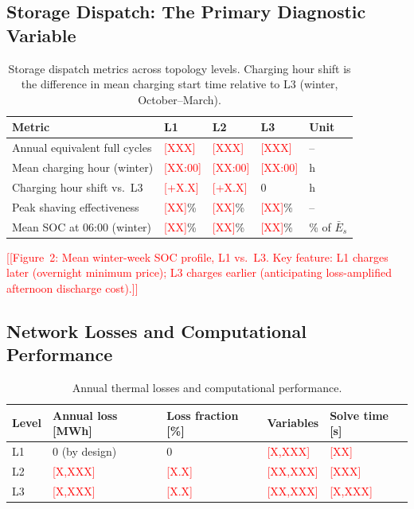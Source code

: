 \documentclass[review,3p]{elsarticle}
\newcommand{\placeholder}[1]{\textcolor{red}{[#1]}}
\begin{document}
\subsection{Storage Dispatch: The Primary Diagnostic Variable}
\label{sec:results_storage}

\begin{table}[htbp]
\centering
\caption{Storage dispatch metrics across topology levels. Charging
hour shift is the difference in mean charging start time relative
to L3 (winter, October--March).}
\label{tab:storage}
\begin{tabular}{@{}lllll@{}}
\toprule
Metric & L1 & L2 & L3 & Unit \\
\midrule
Annual equivalent full cycles   & \placeholder{XXX}   & \placeholder{XXX}   & \placeholder{XXX}   & -- \\
Mean charging hour (winter)     & \placeholder{XX:00} & \placeholder{XX:00} & \placeholder{XX:00} & h \\
Charging hour shift vs.\ L3    & \placeholder{+X.X}  & \placeholder{+X.X}  & 0                   & h \\
Peak shaving effectiveness      & \placeholder{XX}\%  & \placeholder{XX}\%  & \placeholder{XX}\%  & -- \\
Mean SOC at 06:00 (winter)     & \placeholder{XX}\%  & \placeholder{XX}\%  & \placeholder{XX}\%  & \% of $\bar{E}_s$ \\
\bottomrule
\end{tabular}
\end{table}

\placeholder{[Figure~2: Mean winter-week SOC profile, L1 vs.\ L3.
Key feature: L1 charges later (overnight minimum price); L3 charges
earlier (anticipating loss-amplified afternoon discharge cost).]}

\subsection{Network Losses and Computational Performance}
\label{sec:results_losses}

\begin{table}[htbp]
\centering
\caption{Annual thermal losses and computational performance.}
\label{tab:losses_computation}
\begin{tabular}{@{}lllll@{}}
\toprule
Level & Annual loss [MWh] & Loss fraction [\%] & Variables & Solve time [s] \\
\midrule
L1 & 0 (by design)        & 0                    & \placeholder{X,XXX}  & \placeholder{XX} \\
L2 & \placeholder{X,XXX}  & \placeholder{X.X}    & \placeholder{XX,XXX} & \placeholder{XXX} \\
L3 & \placeholder{X,XXX}  & \placeholder{X.X}    & \placeholder{XX,XXX} & \placeholder{X,XXX} \\
\bottomrule
\end{tabular}
\end{table}
\end{document}
